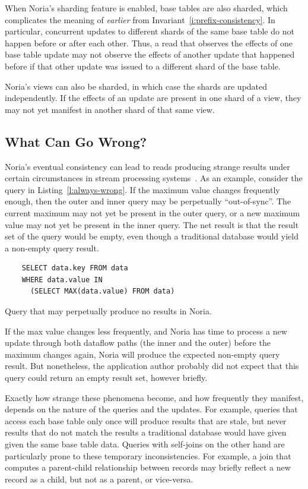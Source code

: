 When Noria's sharding feature is enabled, base tables are also sharded, which
complicates the meaning of \emph{earlier} from
Invariant~\ref{i:prefix-consistency}. In particular, concurrent updates to
different shards of the same base table do not happen before or after each
other. Thus, a read that observes the effects of one base table update may not
observe the effects of another update that happened before if that other update
was issued to a different shard of the base table.

Noria's views can also be sharded, in which case the shards are updated
independently. If the effects of an update are present in one shard of a view,
they may not yet manifest in another shard of that same view.

\subsection{What Can Go Wrong?}

Noria's eventual consistency can lead to reads producing strange results
under certain circumstances in stream processing
systems~\cite{materialize-eventual}. As an example, consider the query in
Listing~\vref{l:always-wrong}. If the maximum value changes frequently enough,
then the outer and inner query may be perpetually ``out-of-sync''. The current
maximum may not yet be present in the outer query, or a new maximum value may
not yet be present in the inner query. The net result is that the result set of
the query would be empty, even though a traditional database would yield a
non-empty query result.

\begin{listing}[h]
  \begin{verbatim}
    SELECT data.key FROM data
    WHERE data.value IN
      (SELECT MAX(data.value) FROM data)
  \end{verbatim}
  \caption{Query that may perpetually produce no results in Noria.}
  \label{l:always-wrong}
\end{listing}

If the max value changes less frequently, and Noria has time to process a new
update through both dataflow paths (the inner and the outer) before the maximum
changes again, Noria will produce the expected non-empty query result. But
nonetheless, the application author probably did not expect that this query
could return an empty result set, however briefly.

Exactly how strange these phenomena become, and how frequently they manifest,
depends on the nature of the queries and the updates. For example, queries that
access each base table only once will produce results that are stale, but never
results that do not match the results a traditional database would have given
given the same base table data. Queries with self-joins on the other hand are
particularly prone to these temporary inconsistencies. For example, a join that
computes a parent-child relationship between records may briefly reflect a new
record as a child, but not as a parent, or vice-versa.

